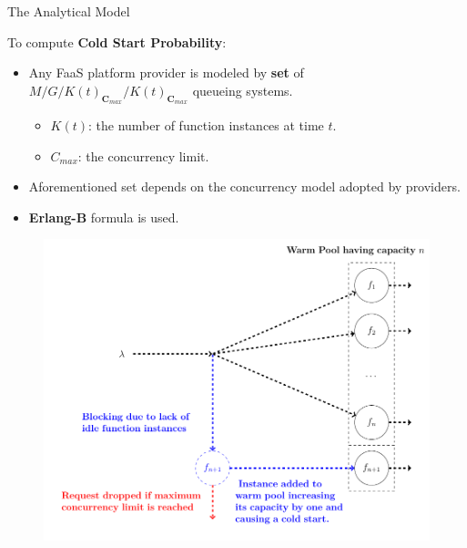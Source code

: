 \documentclass[13.5pt]{beamer}
\newcommand{\B}[1]{\textcolor{TorVergataColor}{\textbf{#1}}}
\begin{document}
\begin{frame}{The Analytical Model}
	
	To compute \B{Cold Start Probability}:
	
	\begin{itemize}
		\vspace{\baselineskip}
		\item Any FaaS platform provider is modeled  by \B{set} of $M/G/K(t)_{\textbf{C}_{max}}/K(t)_{\textbf{C}_{max}}$ queueing systems.
		\begin{itemize}
			\item $K(t)$: the number of function instances at time $t$.
			\item $C_{max}$: the concurrency limit.
		\end{itemize}
		\vspace{\baselineskip}
		\item Aforementioned set depends on the concurrency model adopted by providers.
		\vspace{\baselineskip}
		\item \B{Erlang-B} formula is used.
	\end{itemize}
	
	
	
\end{frame}
\begin{frame}{}
	
\begin{figure}[h]
	\centering
	\includegraphics[width=\textwidth]{../Images/FaaSForSlide.png}
\end{figure}
	
\end{frame} 
\end{document}
